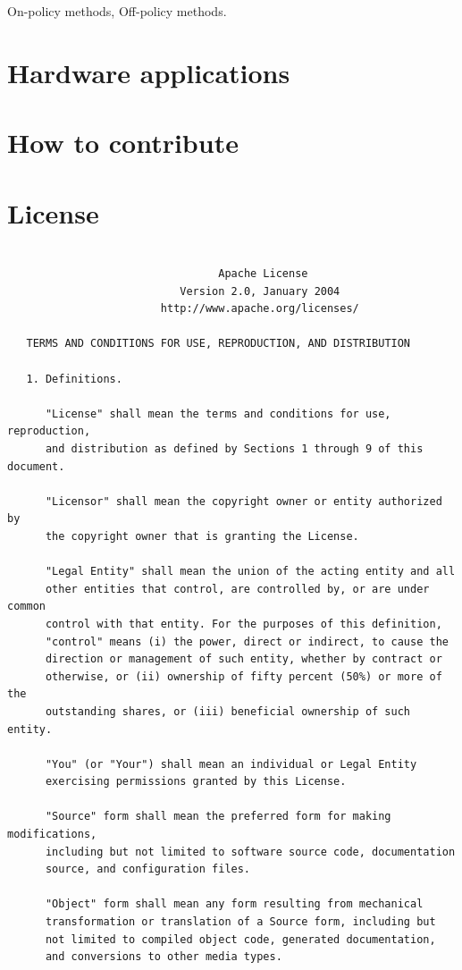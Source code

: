 \documentclass{book}
\begin{document}
On-policy methods, Off-policy methods.



\chapter{Hardware applications}


\chapter{How to contribute}

\chapter{License}

\begin{verbatim}

                                 Apache License
                           Version 2.0, January 2004
                        http://www.apache.org/licenses/

   TERMS AND CONDITIONS FOR USE, REPRODUCTION, AND DISTRIBUTION

   1. Definitions.

      "License" shall mean the terms and conditions for use, reproduction,
      and distribution as defined by Sections 1 through 9 of this document.

      "Licensor" shall mean the copyright owner or entity authorized by
      the copyright owner that is granting the License.

      "Legal Entity" shall mean the union of the acting entity and all
      other entities that control, are controlled by, or are under common
      control with that entity. For the purposes of this definition,
      "control" means (i) the power, direct or indirect, to cause the
      direction or management of such entity, whether by contract or
      otherwise, or (ii) ownership of fifty percent (50%) or more of the
      outstanding shares, or (iii) beneficial ownership of such entity.

      "You" (or "Your") shall mean an individual or Legal Entity
      exercising permissions granted by this License.

      "Source" form shall mean the preferred form for making modifications,
      including but not limited to software source code, documentation
      source, and configuration files.

      "Object" form shall mean any form resulting from mechanical
      transformation or translation of a Source form, including but
      not limited to compiled object code, generated documentation,
      and conversions to other media types.


\end{verbatim}
\end{document}
